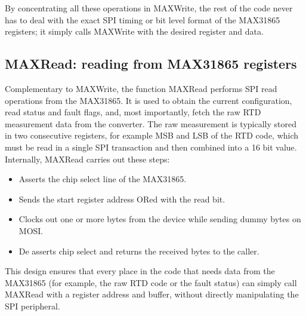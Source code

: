 By concentrating all these operations in MAXWrite, the rest of the code never has to deal with the exact SPI timing or bit level format of the MAX31865 registers; it simply calls MAXWrite with the desired register and data.


\subsection{MAXRead: reading from MAX31865 registers}
Complementary to MAXWrite, the function MAXRead performs SPI read operations from the MAX31865. It is used to obtain the current configuration, read status and fault flags, and, most importantly, fetch the raw RTD measurement data from the converter. The raw measurement is typically stored in two consecutive registers, for example MSB and LSB of the RTD code, which must be read in a single SPI transaction and then combined into a 16 bit value.
Internally, MAXRead carries out these steps:
\begin{itemize}
    \item Asserts the chip select line of the MAX31865.
    \item Sends the start register address ORed with the read bit.
    \item Clocks out one or more bytes from the device while sending dummy bytes on MOSI.
    \item De asserts chip select and returns the received bytes to the caller.
\end{itemize}
This design ensures that every place in the code that needs data from the MAX31865 (for example, the raw RTD code or the fault status) can simply call MAXRead with a register address and buffer, without directly manipulating the SPI peripheral.


